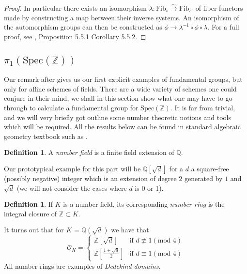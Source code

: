 \documentclass{article}
\theoremstyle{definition}
\newtheorem{definition}[theorem]{Definition}
\theoremstyle{remark}
\theoremstyle{plain}
\newcommand{\Z}{\mathbb{Z}}
\newcommand{\Q}{\mathbb{Q}}
\newcommand{\mc}[1]{\mathcal{#1}}
\begin{document}
\begin{proof}
	In particular there exists an isomorphism $\lambda: \text{Fib}_{\overline{s}} \xrightarrow{\sim} \text{Fib}_{\overline{s}'}$ of fiber functors made by constructing a map between their inverse systems.
	An isomorphism of the automorphism groups can then be constructed as $\phi \to \lambda^{-1} \circ \phi \circ \lambda$.
	For a full proof, see \cite{Szamuely}, Proposition 5.5.1 Corollary 5.5.2.
\end{proof}

\subsection{$\pi_1(\text{Spec}(\Z))$}

Our remark after  gives us our first explicit examples of fundamental groups, but only for affine schemes of fields.
There are a wide variety of schemes one could conjure in their mind, we shall in this section show what one may have to go through to calculate a fundamental group for $\text{Spec}(\Z)$.
It is far from trivial, and we will very briefly got outline some number theoretic notions and tools which will be required.
All the results below can be found in standard algebraic geometry textbook such as \cite{langnumbertheory}.

\begin{definition}
	A \textit{number field} is a finite field extension of $\Q$.
\end{definition}

Our prototypical example for this part will be $\Q[\sqrt{d}]$ for a $d$ a square-free (possibly negative) integer which is an extension of degree 2 generated by $1$ and $\sqrt{d}$ (we will not consider the cases where $d$ is 0 or 1).

\begin{definition}
	If $K$ is a number field, its corresponding \textit{number ring} is the integral closure of $\Z \subset K$.
\end{definition}

It turns out that for $K$ = $\Q(\sqrt{d})$ we have that 
\[
	\mc{O}_K =
\left\{
	\begin{array}{ll}
	\Z[\sqrt{d}]  & \mbox{if } d \not\equiv 1 (\text{mod } 4) \\
	\Z[ \frac{1+\sqrt{d}}{2}] & \mbox{if } d \equiv 1 (\text{mod } 4)
	\end{array}
\right.\]
All number rings are examples of \textit{Dedekind domains}.
\end{document}
